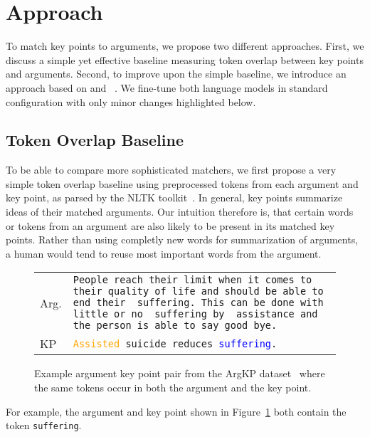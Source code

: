 \section{Approach}\label{approach}

To match key points to arguments, we propose two different approaches.
First, we discuss a simple yet effective baseline measuring token overlap between key points and arguments.
Second, to improve upon the simple baseline, we introduce an approach based on \Bert and \Roberta~\cite{DevlinCLT2019,LiuOGDJCLLZS2019}. We fine-tune both language models in standard configuration with only minor changes highlighted below.

\subsection{Token Overlap Baseline}
To be able to compare more sophisticated matchers, we first propose a very simple token overlap baseline using preprocessed tokens from each argument and key point, as parsed by the NLTK toolkit~\cite{BirdL2004}. 
In general, key points summarize ideas of their matched arguments.
Our intuition therefore is, that certain words or tokens from an argument are also likely to be present in its matched key points.
Rather than using completly new words for summarization of arguments, a human would tend to reuse most important words from the argument.
\begin{figure}
    \begin{tabularx}{\linewidth}{@{}lX@{}}
        Arg. & \texttt{People reach their limit when it comes to their quality of life and should be able to end their {\color{blue} suffering}. This can be done with little or no {\color{blue} suffering} by {\color{orange} assistance} and the person is able to say good bye.} \\
        KP & \texttt{\textcolor{orange}{Assisted} suicide reduces \textcolor{blue}{suffering}.}
    \end{tabularx}
    \caption{Example argument key point pair from the ArgKP dataset~\cite{Bar-HaimEFKLS2020} where the same tokens occur in both the argument and the key point.}
    \label{example-overlap}
\end{figure}
For example, the argument and key point shown in Figure~\ref{example-overlap} both contain the token \texttt{suffering}.

